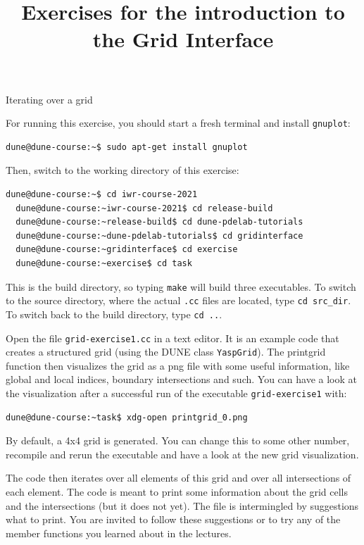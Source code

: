 \documentclass[12pt,a4paper]{article}
\title{\textbf{Exercises for the introduction to the Grid Interface}}
\begin{document}
\exerciseheader

\begin{Exercise}{Iterating over a grid}

For running this exercise, you should start a fresh terminal and install \texttt{gnuplot}:
\begin{lstlisting}[language=bash,keywordstyle=\color{blue}]
  dune@dune-course:~$ sudo apt-get install gnuplot
\end{lstlisting}

Then, switch to the working directory of this exercise:
\begin{lstlisting}[language=bash,keywordstyle=\color{blue}]
  dune@dune-course:~$ cd iwr-course-2021
  dune@dune-course:~iwr-course-2021$ cd release-build
  dune@dune-course:~release-build$ cd dune-pdelab-tutorials
  dune@dune-course:~dune-pdelab-tutorials$ cd gridinterface
  dune@dune-course:~gridinterface$ cd exercise
  dune@dune-course:~exercise$ cd task
\end{lstlisting}

This is the build directory, so typing \lstinline!make! will build three executables.
To switch to the source directory, where the actual \lstinline!.cc! files are located, type \lstinline!cd src_dir!.
To switch back to the build directory, type \lstinline!cd ..!.

Open the file \texttt{grid-exercise1.cc} in a text editor.  It is an
example code that creates a structured grid (using the DUNE class
\texttt{YaspGrid}). The printgrid function then visualizes the grid
as a png file with some useful information, like global and local
indices, boundary intersections and such. You can have a look at the
visualization after a successful run of the executable \lstinline!grid-exercise1!
with:

\begin{lstlisting}[language=bash,keywordstyle=\color{blue}]
  dune@dune-course:~task$ xdg-open printgrid_0.png
\end{lstlisting}%

By default, a 4x4 grid is generated. You can change this to some
other number, recompile and rerun the executable and have a look at
the new grid visualization.

The code then iterates over all elements of this grid and
over all intersections of each element.  The code is meant to print
some information about the grid cells and the intersections (but it
does not yet).  The file is intermingled by suggestions what to print.
You are invited to follow these suggestions or to try any of the
member functions you learned about in the lectures.


\end{Exercise}
\end{document}
